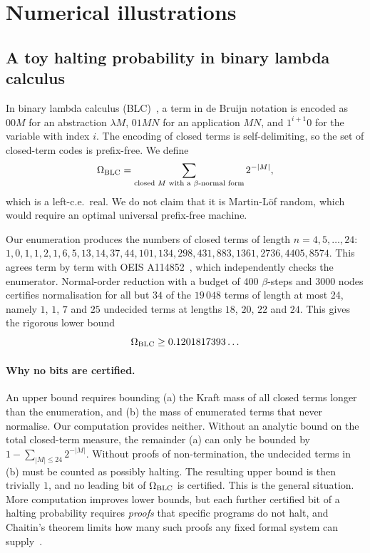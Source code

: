 \documentclass[11pt]{article}
\theoremstyle{definition}\newtheorem{definition}{Definition}[section]
\theoremstyle{remark}\newtheorem*{remark}{Remark}
\begin{document}
\section{Numerical illustrations}
\label{sec:numerics}

\subsection{A toy halting probability in binary lambda calculus}
In binary lambda calculus (BLC)~\cite{Tromp}, a term in de Bruijn notation is encoded as $00M$ for an
abstraction $\lambda M$, $01MN$ for an application $MN$, and $1^{i+1}0$ for the variable with index $i$. The
encoding of closed terms is self-delimiting, so the set of closed-term codes is prefix-free. We define
\begin{equation}
\Omega_{\rm BLC}=\sum_{\text{closed }M\text{ with a }\beta\text{-normal form}}2^{-|M|},
\end{equation}
which is a left-c.e.\ real. We do not claim that it is Martin-L\"of random, which would require an optimal
universal prefix-free machine.

Our enumeration produces the numbers of closed terms of length $n=4,5,\dots,24$:
$1,0,1,1,2,1,6,5,13,14,37,44,101,134,298,431,883,1361,2736,4405,8574$. This agrees term by term with OEIS
A114852~\cite{OEIS}, which independently checks the enumerator. Normal-order reduction with a budget of 400
$\beta$-steps and $3000$ nodes certifies normalisation for all but $34$ of the $19\,048$ terms of length at most 24,
namely $1$, $1$, $7$ and $25$ undecided terms at lengths $18$, $20$, $22$ and $24$. This gives the rigorous lower bound
\begin{equation}
\Omega_{\rm BLC}\ge0.1201817393\ldots
\end{equation}

\paragraph{Why no bits are certified.} An upper bound requires bounding (a) the Kraft mass of all closed terms
longer than the enumeration, and (b) the mass of enumerated terms that never normalise. Our computation
provides neither. Without an analytic bound on the total closed-term measure, the remainder (a) can only be bounded
by $1-\sum_{|M|\le24}2^{-|M|}$. Without proofs of non-termination, the undecided terms in (b) must be counted as
possibly halting. The resulting upper bound is then trivially $1$, and no leading bit of $\Omega_{\rm BLC}$ is
certified. This is the general situation. More computation improves lower bounds, but each further certified bit
of a halting probability requires \emph{proofs} that specific programs do not halt, and Chaitin's theorem
limits how many such proofs any fixed formal system can supply~\cite{Chaitin74}.
\end{document}
